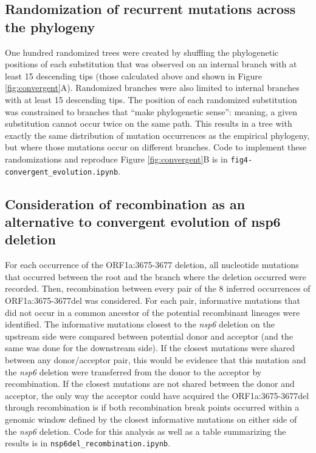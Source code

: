 \documentclass[11pt,oneside,letterpaper]{article}
\begin{document}
\subsection*{Randomization of recurrent mutations across the phylogeny}
One hundred randomized trees were created by shuffling the phylogenetic positions of each substitution that was observed on an internal branch with at least 15 descending tips (those calculated above and shown in Figure \ref{fig:convergent}A). 
Randomized branches were also limited to internal branches with at least 15 descending tips. The position of each randomized substitution was constrained to branches that “make phylogenetic sense”: meaning, a given substitution cannot occur twice on the same path. 
This results in a tree with exactly the same distribution of mutation occurrences as the empirical phylogeny, but where those mutations occur on different branches. 
Code to implement these randomizations and reproduce Figure \ref{fig:convergent}B is in \texttt{fig4-convergent\_evolution.ipynb}.

\subsection*{Consideration of recombination as an alternative to convergent evolution of nsp6 deletion}
For each occurrence of the ORF1a:3675-3677 deletion, all nucleotide mutations that occurred between the root and the branch where the deletion occurred were recorded. 
Then, recombination between every pair of the 8 inferred occurrences of ORF1a:3675-3677del was considered. 
For each pair, informative mutations that did not occur in a common ancestor of the potential recombinant lineages were identified. 
The informative mutations closest to the \emph{nsp6} deletion on the upstream side were compared between potential donor and acceptor (and the same was done for the downstream side). 
If the closest mutations were shared between any donor/acceptor pair, this would be evidence that this mutation and the \emph{nsp6} deletion were transferred from the donor to the acceptor by recombination. 
If the closest mutations are not shared between the donor and acceptor, the only way the acceptor could have acquired the ORF1a:3675-3677del through recombination is if both recombination break points occurred within a genomic window defined by the closest informative mutations on either side of the \emph{nsp6} deletion. 
Code for this analysis as well as a table summarizing the results is in \texttt{nsp6del\_recombination.ipynb}.
\end{document}
